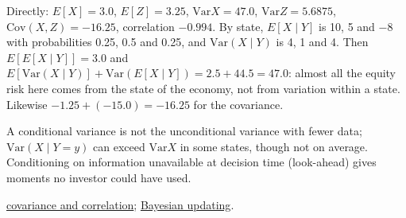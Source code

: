 \begin{qfdefinition}
Directly: $E[X]=3.0$, $E[Z]=3.25$, $\mathrm{Var}X=47.0$, $\mathrm{Var}Z=5.6875$, $\mathrm{Cov}(X,Z)=-16.25$, correlation $-0.994$. By state, $E[X\mid Y]$ is 10, 5 and $-8$ with probabilities 0.25, 0.5 and 0.25, and $\mathrm{Var}(X\mid Y)$ is 4, 1 and 4. Then $E[E[X\mid Y]]=3.0$ and $E[\mathrm{Var}(X\mid Y)]+\mathrm{Var}(E[X\mid Y])=2.5+44.5=47.0$: almost all the equity risk here comes from the state of the economy, not from variation within a state. Likewise $-1.25+(-15.0)=-16.25$ for the covariance.

 A conditional variance is not the unconditional variance with fewer data; $\mathrm{Var}(X\mid Y=y)$ can exceed $\mathrm{Var}X$ in some states, though not on average. Conditioning on information unavailable at decision time (look-ahead) gives moments no investor could have used.

 \hyperref[def:return-dependence]{covariance and correlation}; \hyperref[meth:bayesian-updating]{Bayesian updating}.

\end{qfdefinition}

